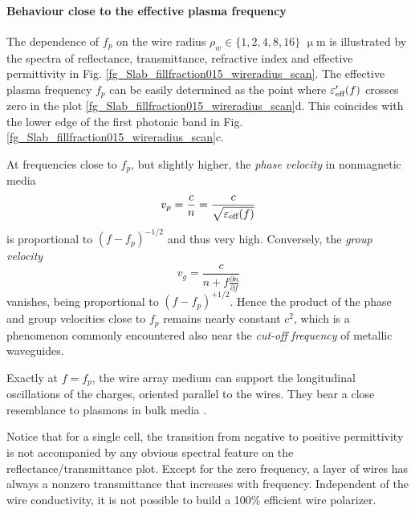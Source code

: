 \paragraph{Behaviour close to the effective plasma frequency}%
The dependence of $f_p$ on the wire radius $\rho_w \in \{1, 2, 4, 8, 16\}$ $\upmu$m is illustrated by the spectra of reflectance, transmittance, refractive index and effective permittivity in Fig. \ref{fg_Slab_fillfraction015_wireradius_scan}. The effective plasma frequency $f_p$ can be easily determined as the point where $\varepsilon_{\text{eff} }'(f)$ crosses zero  in the plot \ref{fg_Slab_fillfraction015_wireradius_scan}d. This coincides with the lower edge of the first photonic band in Fig. \ref{fg_Slab_fillfraction015_wireradius_scan}c. 

At frequencies close to $f_p$, but slightly higher, the \textit{phase velocity} in nonmagnetic media 
\begin{equation} v_p = \frac{c}{n} = \frac{c}{\sqrt{\varepsilon_{\text{eff} }(f)}}\label{eq_vpwire}\end{equation}	
	is proportional to $(f-f_p)^{-1/2}$ and thus very high. Conversely, the \textit{group velocity} \cite{mikki2009electromagnetic}
\begin{equation} v_g = \frac{c}{n+f \frac{\partial n}{\partial f}} \label{eq_vgwire}\end{equation} %
vanishes, being proportional to $(f-f_p)^{+1/2}$. Hence the product of the phase and group velocities close to $f_p$ remains nearly constant $c^2$, which is a phenomenon commonly encountered also near the \textit{cut-off frequency} of metallic waveguides.

Exactly at $f=f_p$, the wire array medium can support the longitudinal oscillations of the charges, oriented parallel to the wires. They bear a close resemblance to plasmons in bulk media \cite{pendry1996extremely}.

Notice that for a single cell, the transition from negative to positive permittivity is not accompanied by any obvious spectral feature on the reflectance/transmittance plot. Except for the zero frequency, a layer of wires has always a nonzero transmittance that increases with frequency. Independent of the wire conductivity, it is not possible to build a 100\% efficient wire polarizer.


